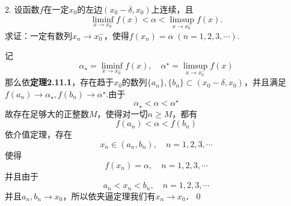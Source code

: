 2. 设函数$f$在一定$x_0$的左边$(x_0-\delta,x_0)$上连续，且
\begin{equation*}
    \liminf_{x \to x_0^-} f(x) < \alpha < \limsup_{x \to x_0^-} f(x).
\end{equation*}
求证：一定有数列$x_n \to x_0^-$，使得$f(x_n)=\alpha \; (n=1,2,3,\cdots)$.

\prove 记
\begin{equation}
    \alpha_\star = \liminf_{x \to x_0^-} f(x), \quad \alpha^\star = \limsup_{x \to x_0^-} f(x)
\end{equation}
那么依\textbf{定理2.11.1}，存在趋于$x_0$的数列$\{ a_n \}, \{ b_n \} \subset (x_0 - \delta, x_0)$，并且满足$f(a_n) \to \alpha_\star, f(b_n) \to \alpha^\star$.由于
\begin{equation}
    \alpha_\star < \alpha < \alpha^\star
\end{equation}
故存在足够大的正整数$M$，使得对一切$n \geq M$，都有
\begin{equation}
    f(a_n) < \alpha < f(b_n)
\end{equation}
依介值定理，存在
\begin{equation}
    x_n \in (a_n, b_n), \quad n = 1,2,3,\cdots
\end{equation}
使得
\begin{equation}
    f(x_n) = \alpha, \quad n = 1,2,3,\cdots
\end{equation}
并且由于
\begin{equation}
    a_n < x_n < b_n, \quad n = 1,2,3,\cdots
\end{equation}
并且$a_n, b_n \to x_0$，所以依夹逼定理我们有$x_n \to x_0$．\qed\bigskip